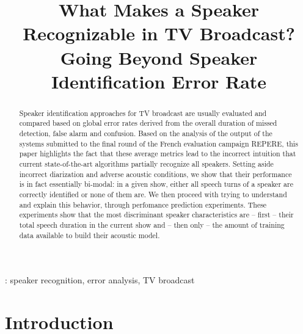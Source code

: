 \documentclass[a4paper]{article}
\title{What Makes a Speaker Recognizable in TV Broadcast?\\
Going Beyond Speaker Identification Error Rate}
\begin{document}
\maketitle

\begin{abstract}
\vspace*{-0.2cm}
Speaker identification approaches for TV broadcast are usually evaluated and compared based on global error rates derived from the overall duration of missed detection, false alarm and confusion.
Based on the analysis of the output of the systems submitted to the final round of the French evaluation campaign REPERE, this paper highlights the fact that these average metrics lead to the incorrect intuition that current state-of-the-art algorithms partially recognize all speakers. Setting aside incorrect diarization and adverse acoustic conditions, we show that their performance is in fact essentially bi-modal: in a given show, either all speech turns of a speaker are correctly identified or none of them are. We then proceed with trying to understand and explain this behavior, through perfomance prediction experiments. These experiments show that the most discriminant speaker characteristics are -- first -- their total speech duration in the current show and -- then only -- the amount of training data available to build their acoustic model.
\end{abstract}

: speaker recognition, error analysis, TV broadcast

\section{Introduction}
\label{sec:introduction}

\end{document}
